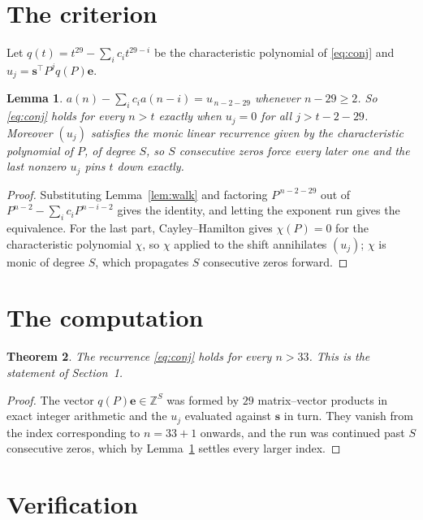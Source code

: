 \documentclass[11pt,a4paper]{article}
\theoremstyle{plain}
\newtheorem{theorem}{Theorem}
\newtheorem{lemma}[theorem]{Lemma}
\theoremstyle{definition}
\begin{document}
\section{The criterion}

Let $q(t)=t^{29}-\sum_i c_i t^{29-i}$ be the characteristic polynomial of
\eqref{eq:conj} and $u_j=\mathbf{s}^{\!\top}P^{j}q(P)\mathbf{e}$.

\begin{lemma}\label{lem:crit}
$a(n)-\sum_i c_i a(n-i)=u_{\,n-2-29}$ whenever $n-29\ge2$. So \eqref{eq:conj}
holds for every $n>t$ exactly when $u_j=0$ for all $j>t-2-29$. Moreover $(u_j)$
satisfies the monic linear recurrence given by the characteristic polynomial of $P$, of
degree $S$, so $S$ consecutive zeros force every later one and the last nonzero $u_j$ pins
$t$ down exactly.
\end{lemma}

\begin{proof}
Substituting Lemma~\ref{lem:walk} and factoring $P^{\,n-2-29}$ out of
$P^{n-2}-\sum_i c_i P^{n-i-2}$ gives the identity, and letting the exponent run gives the
equivalence. For the last part, Cayley--Hamilton gives $\chi(P)=0$ for the characteristic
polynomial $\chi$, so $\chi$ applied to the shift annihilates $(u_j)$; $\chi$ is monic of
degree $S$, which propagates $S$ consecutive zeros forward.
\end{proof}

\section{The computation}

\begin{theorem}
The recurrence \eqref{eq:conj} holds for every $n>33$. This is the statement of
Section~1.
\end{theorem}

\begin{proof}
The vector $q(P)\mathbf{e}\in\mathbb{Z}^{S}$ was formed by $29$ matrix--vector
products in exact integer arithmetic and the $u_j$ evaluated against $\mathbf{s}$ in turn.
They vanish from the index corresponding to $n=33+1$ onwards, and the run was continued
past $S$ consecutive zeros, which by Lemma~\ref{lem:crit} settles every larger index.
\end{proof}

\section{Verification}
\end{document}
